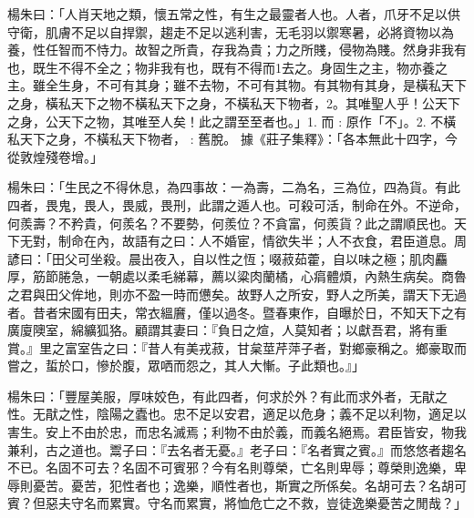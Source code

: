 \begin{pinyinscope}
楊朱曰：「人肖天地之類，懷五常之性，有生之最靈者人也。人者，爪牙不足以供守衛，肌膚不足以自捍禦，趨走不足以逃利害，无毛羽以禦寒暑，必將資物以為養，性任智而不恃力。故智之所貴，存我為貴；力之所賤，侵物為賤。然身非我有也，既生不得不全之；物非我有也，既有不得而1去之。身固生之主，物亦養之主。雖全生身，不可有其身；雖不去物，不可有其物。有其物有其身，是橫私天下之身，橫私天下之物不橫私天下之身，不橫私天下物者，2。其唯聖人乎！公天下之身，公天下之物，其唯至人矣！此之謂至至者也。」1. 而 : 原作「不」。2. 不橫私天下之身，不橫私天下物者， : 舊脫。 據《莊子集釋》：「各本無此十四字，今從敦煌殘卷增。」

楊朱曰：「生民之不得休息，為四事故：一為壽，二為名，三為位，四為貨。有此四者，畏鬼，畏人，畏威，畏刑，此謂之遁人也。可殺可活，制命在外。不逆命，何羨壽？不矜貴，何羨名？不要勢，何羨位？不貪富，何羨貨？此之謂順民也。天下无對，制命在內，故語有之曰：人不婚宦，情欲失半；人不衣食，君臣道息。周諺曰：「田父可坐殺。晨出夜入，自以性之恆；啜菽茹藿，自以味之極；肌肉麤厚，筋節腃急，一朝處以柔毛綈幕，薦以粱肉蘭橘，心㾓體煩，內熱生病矣。商魯之君與田父侔地，則亦不盈一時而憊矣。故野人之所安，野人之所美，謂天下无過者。昔者宋國有田夫，常衣縕黂，僅以過冬。暨春東作，自曝於日，不知天下之有廣廈隩室，綿纊狐狢。顧謂其妻曰：『負日之煊，人莫知者；以獻吾君，將有重賞。』里之富室告之曰：『昔人有美戎菽，甘枲莖芹萍子者，對鄉豪稱之。鄉豪取而嘗之，蜇於口，慘於腹，眾哂而怨之，其人大慚。子此類也。』」

楊朱曰：「豐屋美服，厚味姣色，有此四者，何求於外？有此而求外者，无猒之性。无猒之性，陰陽之蠹也。忠不足以安君，適足以危身；義不足以利物，適足以害生。安上不由於忠，而忠名滅焉；利物不由於義，而義名絕焉。君臣皆安，物我兼利，古之道也。鬻子曰：『去名者无憂。』老子曰：『名者實之賓。』而悠悠者趨名不已。名固不可去？名固不可賓邪？今有名則尊榮，亡名則卑辱；尊榮則逸樂，卑辱則憂苦。憂苦，犯性者也；逸樂，順性者也，斯實之所係矣。名胡可去？名胡可賓？但惡夫守名而累實。守名而累實，將恤危亡之不救，豈徒逸樂憂苦之閒哉？」


\end{pinyinscope}